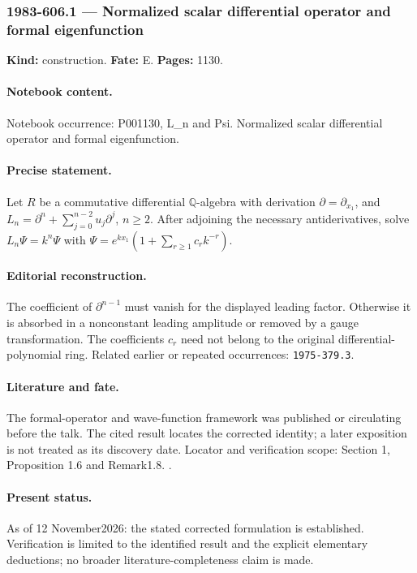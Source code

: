 \subsubsection{1983-606.1 --- Normalized scalar differential operator and formal eigenfunction}

\label{item:1983-606.1}

\noindent\textbf{Kind:} construction. \textbf{Fate:} E. \textbf{Pages:} 1130.\par

\paragraph{Notebook content.} Notebook occurrence: P001130, L_n and Psi. Normalized scalar differential operator and formal eigenfunction.

\paragraph{Precise statement.} Let \(R\) be a commutative differential \(\mathbb Q\)-algebra with derivation \(\partial=\partial_{x_1}\), and \(L_n=\partial^n+\sum_{j=0}^{n-2}u_j\partial^j\), \(n\ge2\). After adjoining the necessary antiderivatives, solve \(L_n\Psi=k^n\Psi\) with \(\Psi=e^{kx_1}(1+\sum_{r\ge1}c_rk^{-r})\).

\paragraph{Editorial reconstruction.} The coefficient of \(\partial^{n-1}\) must vanish for the displayed leading factor. Otherwise it is absorbed in a nonconstant leading amplitude or removed by a gauge transformation. The coefficients \(c_r\) need not belong to the original differential-polynomial ring. Related earlier or repeated occurrences: \texttt{1975-379.3}.

\paragraph{Literature and fate.} The formal-operator and wave-function framework was published or circulating before the talk. The cited result locates the corrected identity; a later exposition is not treated as its discovery date. Locator and verification scope: Section 1, Proposition 1.6 and Remark1.8. \cite{cherednik1978differential}.

\paragraph{Present status.} As of 12 November2026: the stated corrected formulation is established. Verification is limited to the identified result and the explicit elementary deductions; no broader literature-completeness claim is made.

